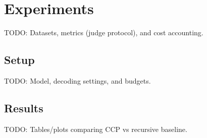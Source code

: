\section{Experiments}

TODO: Datasets, metrics (judge protocol), and cost accounting.

\subsection{Setup}
TODO: Model, decoding settings, and budgets.

\subsection{Results}
TODO: Tables/plots comparing CCP vs recursive baseline.

